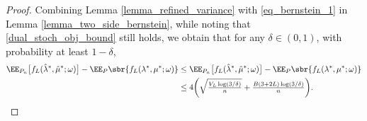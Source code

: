 \documentclass[9pt]{article} %
\numberwithin{equation}{section}
\renewcommand{\frac}[2]{\tfrac{#1}{#2}}
\begin{document}
\begin{proof}
Combining Lemma \ref{lemma_refined_variance} with \eqref{eq_bernstein_1} in Lemma \ref{lemma_two_side_bernstein}, while noting that \eqref{dual_stoch_obj_bound} still holds,
we obtain that for any $\delta \in (0,1)$, with probability at least $1-\delta$,
\begin{align}
 \EE_{P_n} \big[{f_L(\hat{\lambda}^*, \hat{\mu}^*; \omega) }\big] - \EE_{P} \sbr{f_L(\lambda^*, \mu^*; \omega) }  &
\leq  
 \EE_{P_n} \big[{f_L(\hat{\lambda}^*, \hat{\mu}^*; \omega) }\big] - \EE_{P} \sbr{f_L(\lambda^*, \mu^*; \omega) } 
\nonumber  \\
& \leq   4 
\bigg({
 \sqrt{\frac{ V_L \log(3/\delta)}{n}} + \frac{B (3 + 2L) \log(3/\delta)}{n} 
} \bigg). \label{ineq_row_diff_pop_improved}
\end{align}




\end{proof}
\end{document}
